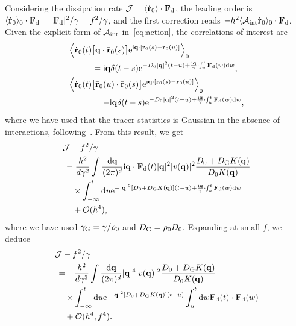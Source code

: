 \documentclass[pre, superscriptaddress, twocolumn,pre]{revtex4-1}
\begin{document}
Considering the dissipation rate ${\cal J}=\langle\dot{\bf r}_0\rangle\cdot{\bf F}_{\rm d}$, the leading order is $\langle\dot{\bf r}_0\rangle_0 \cdot {\bf F}_{\rm d} = |{\bf F}_{\rm d}|^2/\gamma = f^2/\gamma$, and the first correction reads $ - h^2 \langle{\cal A}_{\rm int}\dot{\bf r}_0\rangle_0 \cdot {\bf F}_{\rm d} $. Given the explicit form of ${\cal A}_{\rm int}$ in~\eqref{eq:action}, the correlations of interest are
\begin{equation}
	\begin{aligned}
		\Big\langle\dot{\bf r}_0(t) &\big[{\bf q}\cdot\bar{\bf r}_0(s)\big] {\rm e}^{{\rm i}{\bf q}\cdot[{\bf r}_0(s)-{\bf r}_0(u)]}\Big\rangle_0
		\\
		&= {\rm i}{\bf q}\delta(t-s){\rm e}^{ - D_0|{\bf q}|^2(t-u) + \frac{{\rm i}{\bf q}}{\gamma}\cdot\int_u^t {\bf F}_{\rm d}(w) {\rm d}w} ,
		\\
		\Big\langle\dot{\bf r}_0(t) &\big[\bar{\bf r}_0(u)\cdot\bar{\bf r}_0(s)\big] {\rm e}^{{\rm i}{\bf q}\cdot[{\bf r}_0(s)-{\bf r}_0(u)]}\Big\rangle_0
		\\
		&= -{\rm i}{\bf q}\delta(t-s){\rm e}^{ - D_0|{\bf q}|^2(t-u) + \frac{{\rm i}{\bf q}}{\gamma}\cdot\int_u^t {\bf F}_{\rm d}(w) {\rm d}w} ,
	\end{aligned}
\end{equation}
where we have used that the tracer statistics is Gaussian in the absence of interactions, following~\cite{Demery2011, Demery2014}. From this result, we get
\begin{equation}
	\begin{aligned}
		&{\cal J} - f^2/\gamma
		\\
		&\,= \frac{h^2}{d\gamma^2} \int \frac{{\rm d}{\bf q}}{(2\pi)^d} {\rm i}{\bf q}\cdot{\bf F}_{\rm d}(t) |{\bf q}|^2 |v({\bf q})|^2 \frac{D_0+D_{\rm G}K({\bf q})}{D_0K({\bf q})}
		\\
		&\,\quad\times \int_{-\infty}^t {\rm d}u {\rm e}^{-|{\bf q}|^2 [D_0+D_{\rm G} K({\bf q})](t-u) + \frac{{\rm i}{\bf q}}{\gamma}\cdot\int_u^t{\bf F}_{\rm d}(w){\rm d}w}
		\\
		&\,\quad + {\cal O}(h^4) ,
	\end{aligned}
\end{equation}
where we have used $\gamma_{\rm G}=\gamma/\rho_0$ and $D_{\rm G}=\rho_0D_0$. Expanding at small $f$, we deduce
\begin{equation}
	\begin{aligned}
		&{\cal J} - f^2/\gamma
		\\
		&\,= - \frac{h^2}{d\gamma^3} \int \frac{{\rm d}{\bf q}}{(2\pi)^d} |{\bf q}|^4 |v({\bf q})|^2 \frac{D_0+D_{\rm G}K({\bf q})}{D_0K({\bf q})}
		\\
		&\,\quad\times \int_{-\infty}^t {\rm d}u {\rm e}^{-|{\bf q}|^2 [D_0+D_{\rm G} K({\bf q})](t-u)} \int_u^t{\rm d}w{\bf F}_{\rm d}(t)\cdot{\bf F}_{\rm d}(w)
		\\
		&\,\quad + {\cal O}(h^4,f^4) .
	\end{aligned}
\end{equation}
\end{document}
